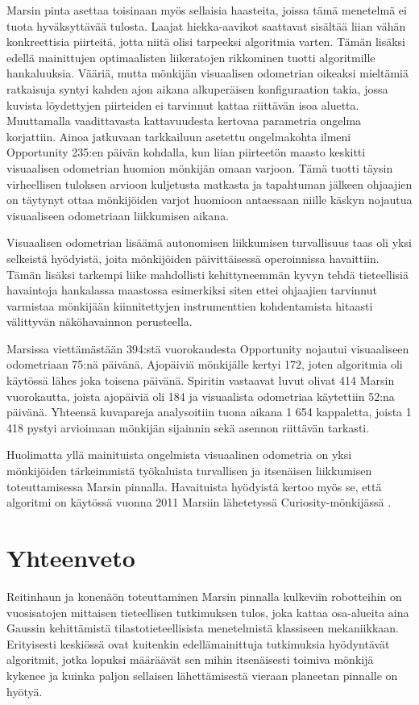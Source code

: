\documentclass[finnish]{tktltiki2}
\theoremstyle{definition}
\theoremstyle{remark}
\begin{document}
Marsin pinta asettaa toisinaan myös sellaisia haasteita, joissa tämä menetelmä ei tuota hyväksyttävää tulosta. Laajat hiekka-aavikot saattavat sisältää liian vähän konkreettisia piirteitä, jotta niitä olisi tarpeeksi algoritmia varten. Tämän lisäksi edellä mainittujen optimaalisten liikeratojen rikkominen tuotti algoritmille hankaluuksia. Vääriä, mutta mönkijän visuaalisen odometrian oikeaksi mieltämiä ratkaisuja syntyi kahden ajon aikana alkuperäisen konfiguraation takia, jossa kuvista löydettyjen piirteiden ei tarvinnut kattaa riittävän isoa aluetta. Muuttamalla vaadittavasta kattavuudesta kertovaa parametria ongelma korjattiin. Ainoa jatkuvaan tarkkailuun asetettu ongelmakohta ilmeni Opportunity 235:en päivän kohdalla, kun liian piirteetön maasto keskitti visuaalisen odometrian huomion mönkijän omaan varjoon. Tämä tuotti täysin virheellisen tuloksen arvioon kuljetusta matkasta ja tapahtuman jälkeen ohjaajien on täytynyt ottaa mönkijöiden varjot huomioon antaessaan niille käskyn nojautua visuaaliseen odometriaan liikkumisen aikana. 

Visuaalisen odometrian lisäämä autonomisen liikkumisen turvallisuus taas oli yksi selkeistä hyödyistä, joita mönkijöiden päivittäisessä operoinnissa havaittiin. Tämän lisäksi tarkempi liike mahdollisti kehittyneemmän kyvyn tehdä tieteellisiä havaintoja hankalassa maastossa esimerkiksi siten ettei ohjaajien tarvinnut varmistaa mönkijään kiinnitettyjen instrumenttien kohdentamista hitaasti välittyvän näköhavainnon perusteella.

Marsissa viettämästään 394:stä vuorokaudesta Opportunity nojautui visuaaliseen odometriaan 75:nä päivänä. Ajopäiviä mönkijälle kertyi 172, joten algoritmia oli käytössä lähes joka toisena päivänä. Spiritin vastaavat luvut olivat 414 Marsin vuorokautta, joista ajopäiviä oli 184 ja visuaalista odometriaa käytettiin 52:na päivänä. Yhteensä kuvapareja analysoitiin tuona aikana 1 654 kappaletta, joista 1 418 pystyi arvioimaan mönkijän sijainnin sekä asennon riittävän tarkasti. \cite{cheng2005visual}

Huolimatta yllä mainituista ongelmista visuaalinen odometria on yksi mönkijöiden tärkeimmistä työkaluista turvallisen ja itsenäisen liikkumisen toteuttamisessa Marsin pinnalla. Havaituista hyödyistä kertoo myös se, että algoritmi on käytössä vuonna 2011 Marsiin lähetetyssä Curiosity-mönkijässä \cite{grotzinger2012mars}.

\section{Yhteenveto}
Reitinhaun ja konenäön toteuttaminen Marsin pinnalla kulkeviin robotteihin on vuosisatojen mittaisen tieteellisen tutkimuksen tulos, joka kattaa osa-alueita aina Gaussin kehittämistä tilastotieteellisista menetelmistä klassiseen mekaniikkaan. Erityisesti keskiössä ovat kuitenkin edellämainittuja tutkimuksia hyödyntävät algoritmit, jotka lopuksi määräävät sen mihin itsenäisesti toimiva mönkijä kykenee ja kuinka paljon sellaisen lähettämisestä vieraan planeetan pinnalle on hyötyä.
\end{document}
